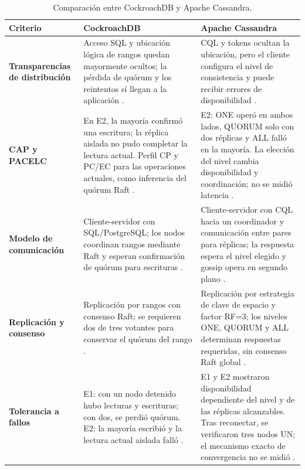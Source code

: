 \documentclass[11pt,a4paper]{article}
\newcommand{\sistemaA}{CockroachDB}      %
\newcommand{\sistemaB}{Apache Cassandra} %
\begin{document}
\begin{table}[H]
  \centering
  \caption{Comparación entre \sistemaA{} y \sistemaB{}.}
  \label{tab:comparacion}
  \scriptsize
  \begin{tabularx}{\textwidth}{@{}>{\bfseries}p{3.4cm}XX@{}}
    \toprule
    Criterio & \sistemaA & \sistemaB \\
    \midrule
    Transparencias de distribución & Acceso SQL y ubicación lógica de rangos quedan mayormente ocultos; la pérdida de quórum y los reintentos sí llegan a la aplicación \cite{cockroachlabsArchitecture,cockroachlabsReplication,cockroachlabsDeveloperBasics}. & CQL y tokens ocultan la ubicación, pero el cliente configura el nivel de consistencia y puede recibir errores de disponibilidad \cite{apacheCassandraDynamo,apacheCassandraNative}. \\
    CAP y PACELC                   & En E2, la mayoría confirmó una escritura; la réplica aislada no pudo completar la lectura actual. Perfil CP y PC/EC para las operaciones actuales, como inferencia del quórum Raft \cite{cockroachlabsReplication}. & E2: ONE operó en ambos lados, QUORUM solo con dos réplicas y ALL falló en la mayoría. La elección del nivel cambia disponibilidad y coordinación; no se midió latencia \cite{apacheCassandraDynamo}. \\
    Modelo de comunicación         & Cliente-servidor con SQL/PostgreSQL; los nodos coordinan rangos mediante Raft y esperan confirmación de quórum para escrituras \cite{cockroachlabsDeveloperBasics,cockroachlabsReplication}. & Cliente-servidor con CQL hacia un coordinador y comunicación entre pares para réplicas; la respuesta espera el nivel elegido y gossip opera en segundo plano \cite{apacheCassandraNative,apacheCassandraMessaging,apacheCassandraDynamo}. \\
    Replicación y consenso         & Replicación por rangos con consenso Raft; se requieren dos de tres votantes para conservar el quórum del rango \cite{cockroachlabsReplication}. & Replicación por estrategia de clave de espacio y factor RF=3; los niveles ONE, QUORUM y ALL determinan respuestas requeridas, sin consenso Raft global \cite{apacheCassandraDynamo}. \\
    Tolerancia a fallos            & E1: con un nodo detenido hubo lecturas y escrituras; con dos, se perdió quórum. E2: la mayoría escribió y la lectura actual aislada falló \cite{cockroachlabsReplication}. & E1 y E2 mostraron disponibilidad dependiente del nivel y de las réplicas alcanzables. Tras reconectar, se verificaron tres nodos UN; el mecanismo exacto de convergencia no se midió \cite{apacheCassandraDynamo,apacheCassandraRepair}. \\
    \bottomrule
  \end{tabularx}
\end{table}
\end{document}
